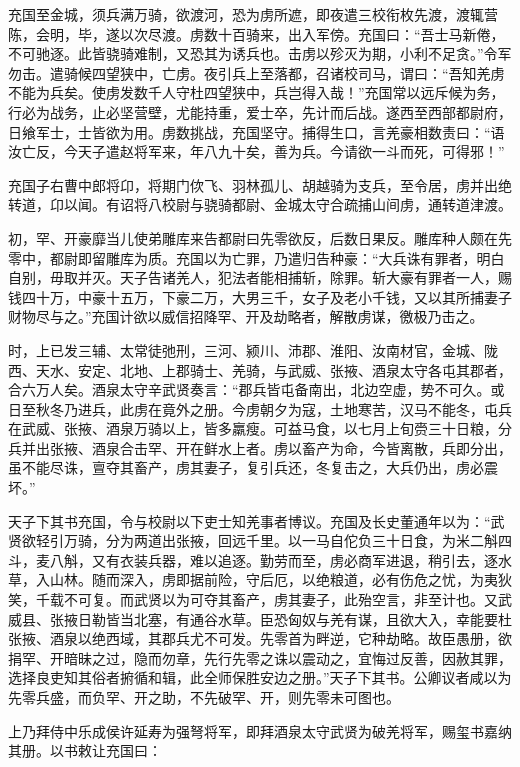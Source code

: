 \documentclass[]{article}
\begin{document}
充国至金城，须兵满万骑，欲渡河，恐为虏所遮，即夜遣三校衔枚先渡，渡辄营陈，会明，毕，遂以次尽渡。虏数十百骑来，出入军傍。充国曰：``吾士马新倦，不可驰逐。此皆骁骑难制，又恐其为诱兵也。击虏以殄灭为期，小利不足贪。''令军勿击。遣骑候四望狭中，亡虏。夜引兵上至落都，召诸校司马，谓曰：``吾知羌虏不能为兵矣。使虏发数千人守杜四望狭中，兵岂得入哉！''充国常以远斥候为务，行必为战务，止必坚营壁，尤能持重，爱士卒，先计而后战。遂西至西部都尉府，日飨军士，士皆欲为用。虏数挑战，充国坚守。捕得生口，言羌豪相数责曰：``语汝亡反，今天子遣赵将军来，年八九十矣，善为兵。今请欲一斗而死，可得邪！''

充国子右曹中郎将卬，将期门佽飞、羽林孤儿、胡越骑为支兵，至令居，虏并出绝转道，卬以闻。有诏将八校尉与骁骑都尉、金城太守合疏捕山间虏，通转道津渡。

初，罕、开豪靡当儿使弟雕库来告都尉曰先零欲反，后数日果反。雕库种人颇在先零中，都尉即留雕库为质。充国以为亡罪，乃遣归告种豪：``大兵诛有罪者，明白自别，毋取并灭。天子告诸羌人，犯法者能相捕斩，除罪。斩大豪有罪者一人，赐钱四十万，中豪十五万，下豪二万，大男三千，女子及老小千钱，又以其所捕妻子财物尽与之。''充国计欲以威信招降罕、开及劫略者，解散虏谋，徼极乃击之。

时，上已发三辅、太常徒弛刑，三河、颍川、沛郡、淮阳、汝南材官，金城、陇西、天水、安定、北地、上郡骑士、羌骑，与武威、张掖、酒泉太守各屯其郡者，合六万人矣。酒泉太守辛武贤奏言：``郡兵皆屯备南出，北边空虚，势不可久。或日至秋冬乃进兵，此虏在竟外之册。今虏朝夕为寇，土地寒苦，汉马不能冬，屯兵在武威、张掖、酒泉万骑以上，皆多羸瘦。可益马食，以七月上旬赍三十日粮，分兵并出张掖、酒泉合击罕、开在鲜水上者。虏以畜产为命，今皆离散，兵即分出，虽不能尽诛，亶夺其畜产，虏其妻子，复引兵还，冬复击之，大兵仍出，虏必震坏。''

天子下其书充国，令与校尉以下吏士知羌事者博议。充国及长史董通年以为：``武贤欲轻引万骑，分为两道出张掖，回远千里。以一马自佗负三十日食，为米二斛四斗，麦八斛，又有衣装兵器，难以追逐。勤劳而至，虏必商军进退，稍引去，逐水草，入山林。随而深入，虏即据前险，守后厄，以绝粮道，必有伤危之忧，为夷狄笑，千载不可复。而武贤以为可夺其畜产，虏其妻子，此殆空言，非至计也。又武威县、张掖日勒皆当北塞，有通谷水草。臣恐匈奴与羌有谋，且欲大入，幸能要杜张掖、酒泉以绝西域，其郡兵尤不可发。先零首为畔逆，它种劫略。故臣愚册，欲捐罕、开暗昧之过，隐而勿章，先行先零之诛以震动之，宜悔过反善，因赦其罪，选择良吏知其俗者捬循和辑，此全师保胜安边之册。''天子下其书。公卿议者咸以为先零兵盛，而负罕、开之助，不先破罕、开，则先零未可图也。

上乃拜侍中乐成侯许延寿为强弩将军，即拜酒泉太守武贤为破羌将军，赐玺书嘉纳其册。以书敕让充国曰：
\end{document}
